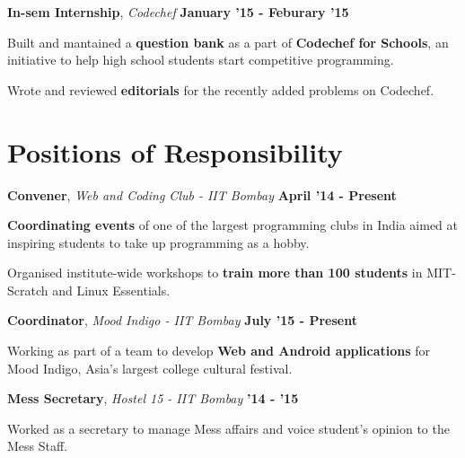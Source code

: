 \documentclass[11pt]{resume}
\begin{document}
\begin{resume}
\textbf{In-sem Internship}, \textsl{Codechef} \hfill \textbf{January '15 - Feburary '15}\\
\vspace{-4mm}
\begin{list2}
\item Built and mantained a \textbf{question bank} as a part of \textbf {Codechef for Schools}, an initiative to help high school students start competitive programming.
\item Wrote and reviewed \textbf{editorials} for the recently added problems on Codechef.
\end{list2}

\section{\mysidestyle Positions of Responsibility}
\textbf{Convener}, \textit{Web and Coding Club - IIT Bombay} \hfill \textbf{April '14 - Present}\\

\vspace{-4mm}
\begin{list2}
\item \textbf{Coordinating events} of one of the largest programming clubs in India aimed at inspiring students to take up programming as a hobby.
\item Organised institute-wide workshops to \textbf{train more than 100 students} in MIT-Scratch and Linux Essentials.
\end{list2}

\textbf{Coordinator}, \textit{Mood Indigo - IIT Bombay} \hfill \textbf{July '15 - Present}\\
\vspace{-4mm}
\begin{list2}
\item Working as part of a team to develop \textbf{Web and Android applications} for Mood Indigo, Asia's largest college cultural festival. 
\end{list2}
\pagebreak
\textbf{Mess Secretary}, \textit{Hostel 15 - IIT Bombay} \hfill \textbf{'14 - '15}\\
\vspace{-4mm}
\begin{list2}
\item Worked as a secretary to manage Mess affairs and voice student's opinion to the Mess Staff.
\end{list2}

\vspace{-2.5mm}


\end{resume}
\end{document}
